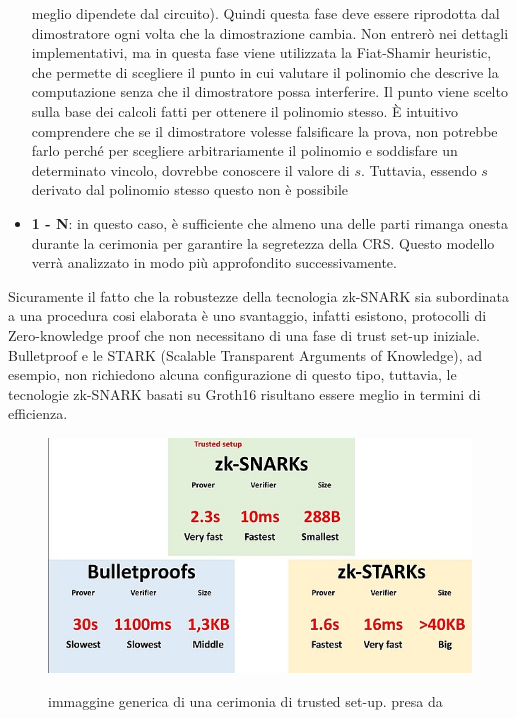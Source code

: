 \begin{itemize}
    meglio dipendete dal circuito). Quindi questa fase deve essere riprodotta dal dimostratore ogni volta che la
    dimostrazione cambia. Non entrerò nei dettagli implementativi, ma in questa fase viene utilizzata la Fiat-Shamir
    heuristic, che permette di scegliere il punto in cui valutare il polinomio che descrive la computazione senza che il
    dimostratore possa interferire. Il punto viene scelto sulla base dei calcoli fatti per ottenere il polinomio stesso. È
    intuitivo comprendere che se il dimostratore volesse falsificare la prova, non potrebbe farlo perché per scegliere
    arbitrariamente il polinomio e soddisfare un determinato vincolo, dovrebbe conoscere il valore di $s$. Tuttavia, essendo
    $s$derivato dal polinomio stesso questo non è possibile
    \item \textbf{1 - N}: in questo caso, è sufficiente che almeno una delle parti rimanga onesta durante la cerimonia per garantire la segretezza della CRS.
    Questo modello verrà analizzato in modo più approfondito successivamente.
\end{itemize}

Sicuramente il fatto che la robustezze della tecnologia zk-SNARK sia subordinata a una procedura cosi elaborata è uno
svantaggio, infatti esistono, protocolli di Zero-knowledge proof che non necessitano di una fase di trust set-up
iniziale. Bulletproof e le STARK (Scalable Transparent Arguments of Knowledge), ad esempio, non richiedono alcuna
configurazione di questo tipo, tuttavia, le tecnologie  zk-SNARK basati su Groth16 risultano essere meglio in termini di
efficienza.
\begin{figure}[H]
    \centering
    \includegraphics[width=13cm]{./chapters/1.state-of-art/images/14.diff_zk.png}
    \label{fig:trusted_setups}
    \captionsetup{justification=centering}
    \caption{immaggine generica di una cerimonia di trusted set-up. presa da \cite{how-do-trusted-setups-work}}
\end{figure}